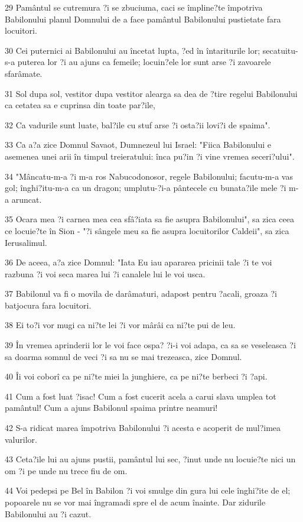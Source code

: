 \par 29 Pamântul se cutremura ?i se zbuciuma, caci se împline?te împotriva Babilonului planul Domnului de a face pamântul Babilonului pustietate fara locuitori.
\par 30 Cei puternici ai Babilonului au încetat lupta, ?ed în întariturile lor; secatuitu-s-a puterea lor ?i au ajuns ca femeile; locuin?ele lor sunt arse ?i zavoarele sfarâmate.
\par 31 Sol dupa sol, vestitor dupa vestitor alearga sa dea de ?tire regelui Babilonului ca cetatea sa e cuprinsa din toate par?ile,
\par 32 Ca vadurile sunt luate, bal?ile cu stuf arse ?i osta?ii lovi?i de spaima".
\par 33 Ca a?a zice Domnul Savaot, Dumnezeul lui Israel: "Fiica Babilonului e asemenea unei arii în timpul treieratului: înca pu?in ?i vine vremea seceri?ului".
\par 34 "Mâncatu-m-a ?i m-a ros Nabucodonosor, regele Babilonului; facutu-m-a vas gol; înghi?itu-m-a ca un dragon; umplutu-?i-a pântecele cu bunata?ile mele ?i m-a aruncat.
\par 35 Ocara mea ?i carnea mea cea sfâ?iata sa fie asupra Babilonului", sa zica ceea ce locuie?te în Sion - "?i sângele meu sa fie asupra locuitorilor Caldeii", sa zica Ierusalimul.
\par 36 De aceea, a?a zice Domnul: "Iata Eu iau apararea pricinii tale ?i te voi razbuna ?i voi seca marea lui ?i canalele lui le voi usca.
\par 37 Babilonul va fi o movila de darâmaturi, adapost pentru ?acali, groaza ?i batjocura fara locuitori.
\par 38 Ei to?i vor mugi ca ni?te lei ?i vor mârâi ca ni?te pui de leu.
\par 39 În vremea aprinderii lor le voi face ospa? ?i-i voi adapa, ca sa se veseleasca ?i sa doarma somnul de veci ?i sa nu se mai trezeasca, zice Domnul.
\par 40 Îi voi coborî ca pe ni?te miei la junghiere, ca pe ni?te berbeci ?i ?api.
\par 41 Cum a fost luat ?isac! Cum a fost cucerit acela a carui slava umplea tot pamântul! Cum a ajuns Babilonul spaima printre neamuri!
\par 42 S-a ridicat marea împotriva Babilonului ?i acesta e acoperit de mul?imea valurilor.
\par 43 Ceta?ile lui au ajuns pustii, pamântul lui sec, ?inut unde nu locuie?te nici un om ?i pe unde nu trece fiu de om.
\par 44 Voi pedepsi pe Bel în Babilon ?i voi smulge din gura lui cele înghi?ite de el; popoarele nu se vor mai îngramadi spre el de acum înainte. Dar zidurile Babilonului au ?i cazut.
